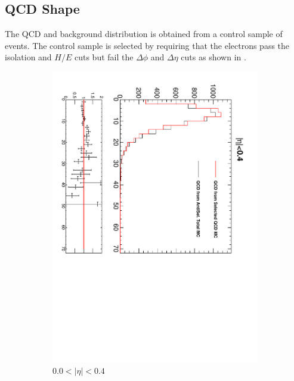 \subsection{{QCD} \ETm Shape}
The {QCD} and \gjet background \ETm distribution is obtained from a control sample of
events. The control sample is selected by requiring that the electrons pass the
isolation and $H/E$ cuts but fail the $\Delta\phi$ and $\Delta\eta$ cuts as
shown in .

\begin{figure}[htbp]
  \centering
  \begin{subfigure}{0.45\textwidth}
    \centering
    \includegraphics*[trim = 0mm 0mm 15mm 0mm, clip, width=\textwidth, angle=90]{MetCompare_anti_eta1.pdf}
    \caption{$0.0<| \eta |<0.4$}
    \label{fig:qcd_met_eta1}
  \end{subfigure}
  \begin{subfigure}{0.45\textwidth}

\end{subfigure}
\end{figure}
